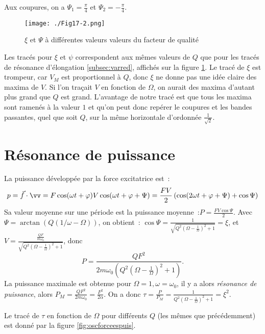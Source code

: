 Aux coupures, on a \(\Psi_1 = \frac{\pi}{4}\) et \(\Psi_2 = -\frac{\pi}{4}\).

\begin{figure}[!h]
  \centering
  \texttt{[image: ./Fig17-2.png]}
  \caption{\(\xi\) et \(\Psi\) à différentes valeurs valeurs du facteur de 
  qualité}
  \label{fig:oscforceesvit}
\end{figure}

Les tracés pour \(\xi\) et \(\psi\) correspondent aux mêmes valeurs de \(Q\) que 
pour les tracés de résonance d'élongation \ref{subsec:varred}, affichés sur la 
figure \ref{fig:oscforceesvit}. Le tracé de \(\xi\) est trompeur, car \(V_M\) 
est proportionnel à \(Q\), donc \(\xi\) ne donne pas une idée claire des maxima 
de \(V\). Si l'on traçait \(V\) en fonction de \(\Omega\), on aurait des maxima 
d'autant plus grand que \(Q\) est grand. L'avantage de notre tracé est que tous 
les maxima sont ramenés à la valeur \(1\) et qu'on peut donc repérer le coupures 
et les bandes passantes, quel que soit \(Q\), sur la même horizontale d'ordonnée 
\(\frac{1}{\sqrt{2}}\).

\section{Résonance de puissance}

La puissance développée par la force excitatrice est~:
\begin{equation}
  p = \vec{f} \cdot \vv = F\cos(\omega t +\varphi) V\cos(\omega t + \varphi + \Psi) 
  = \frac{FV}{2}\left(\cos(2\omega t + \varphi + \Psi) + \cos \Psi\right)
\end{equation}
Sa valeur moyenne sur une période est la \og{}puissance moyenne\fg{}~:\(P = 
\frac{FV\cos\Psi}{2}\). Avec \(\Psi = \arctan(Q(1/\omega - \Omega))\), on 
obtient~: \(\cos \Psi = 
\frac{1}{\sqrt{Q^2\left(\Omega-\frac{1}{\Omega}\right)^2+1}} = \xi\), et \(V = 
\frac{\frac{QF}{m\omega_0}}{\sqrt{Q^2\left(\Omega-\frac{1}{\Omega}\right)^2+1}}\), 
donc 
\begin{equation}
  P = 
  \frac{QF^2}{2m\omega_0\left(Q^2\left(\Omega-\frac{1}{\Omega}\right)^2+1\right)}.
\end{equation}
La puissance maximale est obtenue pour \(\Omega = 1, \omega = \omega_0\), il y a 
alors \emph{résonance de puissance}, alors \(P_M = \frac{QF^2}{2m\omega_0} = 
\frac{F^2}{2\alpha}\). On a donc \(\tau = \frac{P}{P_M} = 
\frac{1}{Q^2\left(\Omega-\frac{1}{\Omega}\right)^2+1} = \xi^2\).

Le tracé de \(\tau\) en fonction de \(\Omega\) pour différents \(Q\) (les mêmes 
que précédemment) est donné par la figure \ref{fig:oscforceespuis}.

